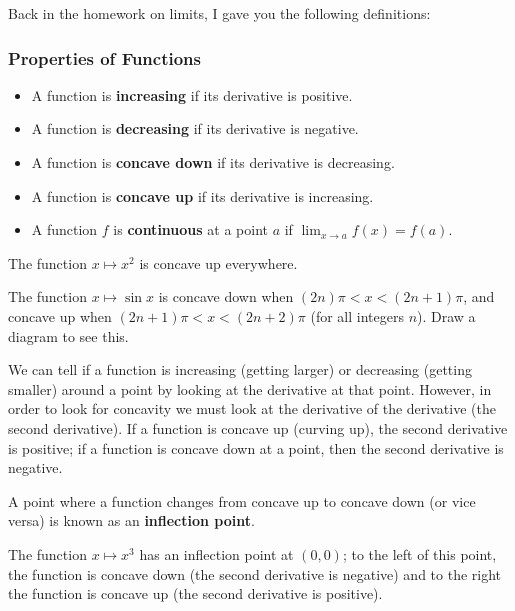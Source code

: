 


Back in the homework on limits, I gave you the following definitions:
\subsubsection*{Properties of Functions}
\begin{itemize}
  \item A function is \textbf{increasing} if its derivative is positive.
  \item A function is \textbf{decreasing} if its derivative is negative.
  \item A function is \textbf{concave down} if its derivative is decreasing.
  \item A function is \textbf{concave up} if its derivative is increasing.
  \item A function $ f $ is \textbf{continuous} at a point $ a $ if $ \lim_{x \to a} f(x) = f(a) $.
\end{itemize}

\begin{ex}
  The function $ x \mapsto x^2 $ is concave up everywhere.
\end{ex}
\begin{ex}
  The function $ x \mapsto \sin x $ is concave down when $ (2n)\pi < x < (2n + 1)\pi $, and concave up when $ (2n + 1)\pi < x < (2n + 2)\pi $
  (for all integers $ n $). Draw a diagram to see this.
\end{ex}

We can tell if a function is increasing (getting larger) or decreasing (getting smaller) around a point by looking at the derivative
at that point. However, in order to look for concavity we must look at the derivative of the derivative (the second derivative). If
a function is concave up (curving up), the second derivative is positive; if a function is concave down at a point, then the second
derivative is negative.

A point where a function changes from concave up to concave down (or vice versa) is known as an \textbf{inflection point}.
\begin{ex}
  The function $ x \mapsto x^3 $ has an inflection point at $ (0,0) $; to the left of this point, the function is concave
  down (the second derivative is negative) and to the right the function is concave up (the second derivative is positive).
\end{ex}


